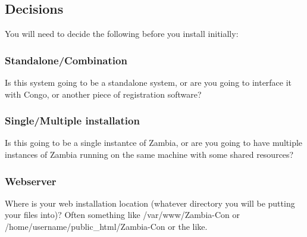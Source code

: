 \documentclass[captions=tablesignature]{scrartcl}
\begin{document}
\subsection{Decisions}
\label{sec-1-2}
You will need to decide the following before you install initially:
\subsubsection{Standalone/Combination}
\label{sec-1-2-1}
Is this system going to be a standalone system, or are you going
to interface it with Congo, or another piece of registration software?

\subsubsection{Single/Multiple installation}
\label{sec-1-2-2}
Is this going to be a single instantce of Zambia, or are you going
to have multiple instances of Zambia running on the same machine
with some shared resources?

\subsubsection{Webserver}
\label{sec-1-2-3}
Where is your web installation location (whatever directory you
will be putting your files into)?  Often something like
/var/www/Zambia-Con or /home/username/public\_html/Zambia-Con or
the like.
\end{document}
